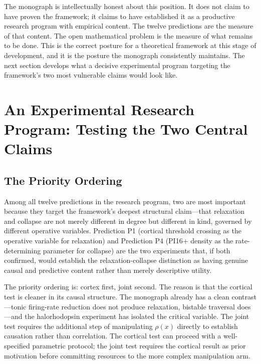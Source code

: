 \documentclass[12pt, a4paper]{article}
\theoremstyle{definition}
\begin{document}
The monograph is intellectually honest about this position. It does not claim to have proven the framework; it claims to have established it as a productive research program with empirical content. The twelve predictions are the measure of that content. The open mathematical problem is the measure of what remains to be done. This is the correct posture for a theoretical framework at this stage of development, and it is the posture the monograph consistently maintains. The next section develops what a decisive experimental program targeting the framework's two most vulnerable claims would look like.

\section{An Experimental Research Program: Testing the Two Central Claims}

\subsection{The Priority Ordering}

Among all twelve predictions in the research program, two are most important because they target the framework's deepest structural claim---that relaxation and collapse are not merely different in degree but different in kind, governed by different operative variables. Prediction P1 (cortical threshold crossing as the operative variable for relaxation) and Prediction P4 (PI16+ density as the rate-determining parameter for collapse) are the two experiments that, if both confirmed, would establish the relaxation-collapse distinction as having genuine causal and predictive content rather than merely descriptive utility.

The priority ordering is: cortex first, joint second. The reason is that the cortical test is cleaner in its causal structure. The monograph already has a clean contrast---tonic firing-rate reduction does not produce relaxation, bistable traversal does---and the halorhodopsin experiment has isolated the critical variable. The joint test requires the additional step of manipulating $\rho(x)$ directly to establish causation rather than correlation. The cortical test can proceed with a well-specified parametric protocol; the joint test requires the cortical result as prior motivation before committing resources to the more complex manipulation arm.
\end{document}
